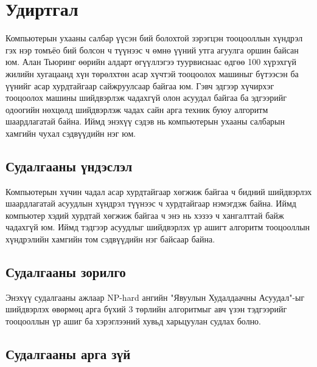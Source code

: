 \chapter{Удиртгал}

Компьютерын ухааны салбар үүсэн бий болохтой зэрэгцэн тооцооллын хүндрэл гэх нэр томъёо бий болсон ч
түүнээс ч өмнө үүний утга агуулга оршин байсан юм. Алан Тьюринг өөрийн алдарт өгүүллэгээ туурвиснаас
өдгөө 100 хүрэхгүй жилийн хугацаанд хүн төрөлхтөн асар хүчтэй тооцоолох машиныг бүтээсэн ба үүнийг асар
хурдтайгаар сайжруулсаар байгаа юм. Гэвч эдгээр хүчирхэг тооцоолох машины шийдвэрлэж чадахгүй олон асуудал байгаа
ба эдгээрийг одоогийн нөхцөлд шийдвэрлэж чадах сайн арга техник буюу алгоритм шаардлагатай байна. Иймд энэхүү
сэдэв нь компьютерын ухааны салбарын хамгийн чухал сэдвүүдийн нэг юм.

\section{Судалгааны үндэслэл}

Компьютерын хүчин чадал асар хурдтайгаар хөгжиж байгаа ч бидний шийдвэрлэх шаардлагатай асуудлын хүндрэл түүнээс ч хурдтайгаар
нэмэгдэж байна. Иймд компьютер хэдий хурдтай хөгжиж байгаа ч энэ нь хэзээ ч хангалттай байж чадахгүй юм. Иймд тэдгээр асуудлыг
шийдвэрлэх үр ашигт алгоритм тооцооллын хүндрэлийн хамгийн том сэдвүүдийн нэг байсаар байна.

\section{Судалгааны зорилго}

Энэхүү судалгааны ажлаар NP-hard ангийн "Явуулын Худалдаачны Асуудал"-ыг шийдвэрлэх өвөрмөц арга бүхий 3 төрлийн
алгоритмыг авч үзэн тэдгээрийг тооцооллын үр ашиг ба хэрэглээний хувьд харьцуулан судлах болно.

\section{Судалгааны арга зүй}
